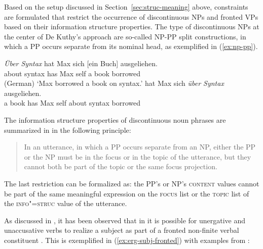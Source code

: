 \documentclass[output=paper,biblatex,babelshorthands,newtxmath,draftmode,colorlinks,citecolor=brown]{langscibook}
\begin{document}
Based on the setup discussed in Section~\ref{sec:struc-meaning} above,
constraints are formulated that restrict the occurrence of
discontinuous NPs and fronted VPs based on their information structure
properties. The type of discontinuous NPs at the center of De
Kuthy's approach are so-called NP-PP\label{inf-struc:page-np-pp-split} split constructions, in which a PP
occurs separate from its nominal head, as exemplified in
(\ref{ex:np-pp}).

\begin{exe}
\ex\label{ex:np-pp} \begin{xlist}
\ex\label{ex:simple-fronted-pp}\gll \textsl{Über Syntax} hat Max sich [ein Buch] ausgeliehen.\\
         {about syntax} has Max self { a} book borrowed\\\hfill(German)
       \trans `Max borrowed a book on syntax.'
    \ex\label{ex:simple-fronted-np} hat Max sich \textsl{über Syntax}    ausgeliehen.\\
 \spacebr{}a book has Max self {about syntax} borrowed\\
\end{xlist}
\end{exe}

\noindent
The information structure properties of discontinuous noun phrases are
summarized in \citet[176]{deKuthy2002a} in the following principle:
\begin{quote}
  In an utterance, in which a PP occurs separate from an NP, either
  the PP or the NP must be in the focus or in the topic of the
  utterance, but they cannot both be part of the topic or the same
  focus projection. \citep[176]{deKuthy2002a}
\end{quote}

\noindent
The last restriction can be formalized as: the PP's or NP's
\textsc{content} values cannot be part of the same
meaningful expression on the \textsc{focus} list or the \textsc{topic}
list of the \textsc{info"=struc} value of the utterance.

\largerpage[2]
As discussed in , it has been observed that in
 it is possible for unergative and unaccusative verbs to
realize a subject as part of a fronted non-finite verbal
constituent \citep{Haider90a}. This is exemplified in (\ref{ex:erg-subj-fronted}) with examples from \citet[94]{Haider90a}:
\end{document}
